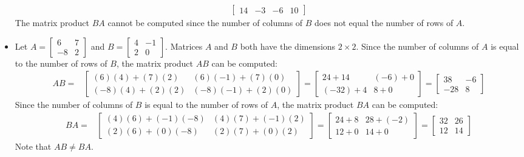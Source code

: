 \documentclass{article}
\begin{document}
\begin{itemize}
\begin{align*}
\begin{bmatrix}
14 & -3 & -6 & 10  
\end{bmatrix}
\end{align*} 
The matrix product \(BA\) cannot be computed since the number of columns of \(B\) does not equal the number of rows of \(A\).
\item Let \(A = \begin{bmatrix} 6 & 7 \\ -8 & 2 \end{bmatrix}\) and \(B = \begin{bmatrix} 4 & -1 \\ 2 & 0 \end{bmatrix}\). Matrices \(A\) and \(B\) both have the dimensions \(2 \times 2\). Since the number of columns of \(A\) is equal to the number of rows of \(B\), the matrix product \(AB\) can be computed:
\begin{align*}
AB
= & \begin{bmatrix}
(6)(4) + (7)(2) & (6)(-1) + (7)(0) \\
(-8)(4) + (2)(2) & (-8)(-1) + (2)(0)
\end{bmatrix}
= \begin{bmatrix}
24 + 14 & (-6) + 0 \\
(-32) + 4 & 8 + 0
\end{bmatrix}
= \begin{bmatrix}
38 & -6 \\
-28 & 8
\end{bmatrix}
\end{align*} 
Since the number of columns of \(B\) is equal to the number of rows of \(A\), the matrix product \(BA\) can be computed: 
\begin{align*}
BA
= & \begin{bmatrix}
(4)(6) + (-1)(-8) & (4)(7) + (-1)(2) \\
(2)(6) + (0)(-8) & (2)(7) + (0)(2)
\end{bmatrix}
= \begin{bmatrix}
24 + 8 & 28 + (-2) \\
12 + 0 & 14 + 0
\end{bmatrix}
= \begin{bmatrix}
32 & 26\\
12 & 14
\end{bmatrix}
\end{align*}
Note that \(AB \neq BA\).
\end{itemize}
\end{document}
